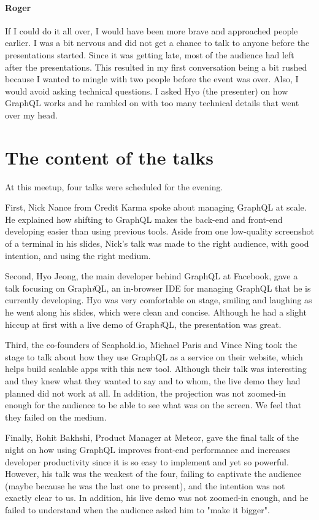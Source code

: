 \documentclass[]{article}
\let\oldparagraph\paragraph
\renewcommand{\paragraph}[1]{\oldparagraph{#1}\mbox{}}
\begin{document}
\paragraph{Roger}
If I could do it all over, I would have been more brave and approached people earlier. I was a bit nervous and did not get a chance to talk to anyone before the presentations started. Since it was getting late, most of the audience had left after the presentations. This resulted in my first conversation being a bit rushed because I wanted to mingle with two people before the event was over. Also, I would avoid asking technical questions. I asked Hyo (the presenter) on how GraphQL works and he rambled on with too many technical details that went over my head.



\section*{The content of the talks}
At this meetup, four talks were scheduled for the evening.

First, Nick Nance from Credit Karma spoke about managing GraphQL at scale. He explained how shifting to GraphQL makes the back-end and front-end developing easier than using previous tools. Aside from one low-quality screenshot of a terminal in his slides, Nick's talk was made to the right audience, with good intention, and using the right medium.

Second, Hyo Jeong, the main developer behind GraphQL at Facebook, gave a talk focusing on Graph\textit{i}QL, an in-browser IDE for managing GraphQL that he is currently developing. Hyo was very comfortable on stage, smiling and laughing as he went along his slides, which were clean and concise. Although he had a slight hiccup at first with a live demo of Graph\textit{i}QL, the presentation was great.

Third, the co-founders of Scaphold.io, Michael Paris and Vince Ning took the stage to talk about how they use GraphQL as a service on their website, which helps build scalable apps with this new tool. Although their talk was interesting and they knew what they wanted to say and to whom, the live demo they had planned did not work at all. In addition, the projection was not zoomed-in enough for the audience to be able to see what was on the screen. We feel that they failed on the medium. 

Finally, Rohit Bakhshi, Product Manager at Meteor, gave the final talk of the night on how using GraphQL improves front-end performance and increases developer productivity since it is so easy to implement and yet so powerful. However, his talk was the weakest of the four, failing to captivate the audience (maybe because he was the last one to present), and the intention was not exactly clear to us. In addition, his live demo was not zoomed-in enough, and he failed to understand when the audience asked him to "make it bigger".
\end{document}
